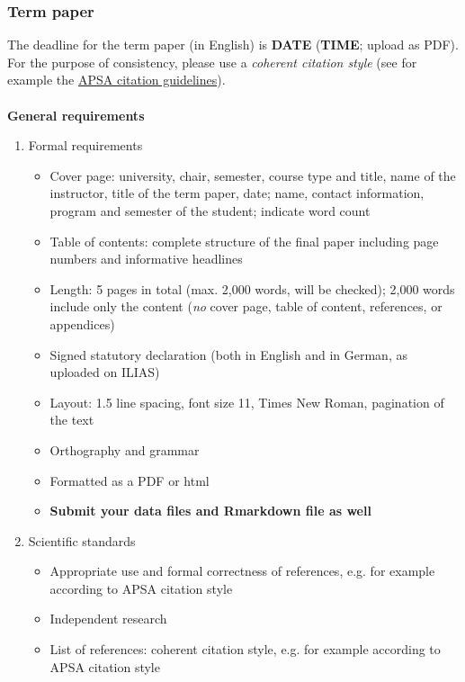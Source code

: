 \documentclass{article}
\begin{document}
\subsubsection*{Term paper}
The deadline for the term paper (in English) is \textbf{DATE} (\textbf{TIME}; upload as PDF). \\
For the purpose of consistency, please use a \textit{coherent citation style} (see for example the \href{http://bit.ly/1J6qOrD}{APSA citation guidelines}).\\
\vspace*{0.1in}\\
\textbf{General requirements}
\begin{enumerate}
\item Formal requirements
\begin{itemize}
\item[-] Cover page: university, chair, semester, course type and title, name of the instructor, title of the term paper, date; name, contact information, program and semester of the student; indicate word count
\item[-] Table of contents: complete structure of the final paper including page numbers and informative headlines
\item[-] Length: 5 pages in total (max. 2,000 words, will be checked); 2,000 words include only the content (\textit{no} cover page, table of content, references, or appendices) %
\item[-] Signed statutory declaration (both in English and in German, as uploaded on ILIAS)
\item[-] Layout: 1.5 line spacing, font size 11, Times New Roman, pagination of the text
\item[-] Orthography and grammar
\item[-] Formatted as a PDF or html
\item[-] \textbf{Submit your data files and \textsf{R}markdown file as well}
\end{itemize}
\item Scientific standards
\begin{itemize}
\item[-] Appropriate use and formal correctness of references, e.g. for example according to APSA citation style
\item[-] Independent research
\item[-] List of references: coherent citation style, e.g. for example according to APSA citation style 
\end{itemize}
\end{enumerate}
\end{document}
